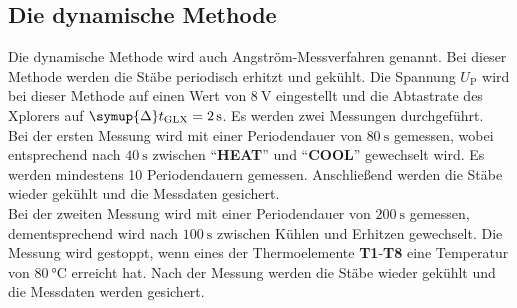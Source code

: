 \subsection{Die dynamische Methode}

    Die dynamische Methode wird auch Angström-Messverfahren genannt.
    Bei dieser Methode werden die Stäbe periodisch erhitzt und gekühlt.
    Die Spannung $U_\text{P}$ wird bei dieser Methode auf einen Wert von $\SI{8}{\volt}$ eingestellt
    und die Abtastrate des Xplorers auf $\symup{\Delta} t_\text{GLX} = \SI{2}{\second}$.
    Es werden zwei Messungen durchgeführt.\\
    Bei der ersten Messung wird mit einer Periodendauer von $\SI{80}{\second}$ gemessen, wobei
    entsprechend nach $\SI{40}{\second}$ zwischen \enquote{\textbf{HEAT}} und \enquote{\textbf{COOL}} gewechselt wird.
    Es werden mindestens 10 Periodendauern gemessen.
    Anschließend werden die Stäbe wieder gekühlt und die Messdaten gesichert.\\
    Bei der zweiten Messung wird mit einer Periodendauer von $\SI{200}{\second}$ gemessen,
    dementsprechend wird nach $\SI{100}{\second}$ zwischen Kühlen und Erhitzen gewechselt.
    Die Messung wird gestoppt, wenn eines der Thermoelemente \textbf{T1}-\textbf{T8} eine Temperatur von $\SI{80}{\celsius}$
    erreicht hat.
    Nach der Messung werden die Stäbe wieder gekühlt und die Messdaten werden gesichert.
